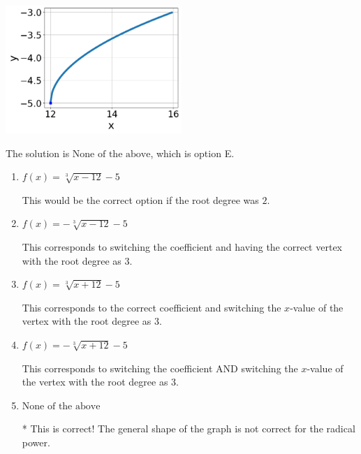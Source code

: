 \documentclass{extbook}[14pt]
\begin{document}
\begin{enumerate}
{\begin{center}
    \includegraphics[width=0.5\textwidth]{../Figures/radicalGraphToEquationA.png}
\end{center}


The solution is \( \text{None of the above} \), which is option E.\begin{enumerate}[label=\Alph*.]
\item \( f(x) = \sqrt[3]{x - 12} - 5 \)

This would be the correct option if the root degree was $2$.
\item \( f(x) = - \sqrt[3]{x - 12} - 5 \)

This corresponds to switching the coefficient and having the correct vertex with the root degree as $3$.
\item \( f(x) = \sqrt[3]{x + 12} - 5 \)

This corresponds to the correct coefficient and switching the $x$-value of the vertex with the root degree as $3$.
\item \( f(x) = - \sqrt[3]{x + 12} - 5 \)

This corresponds to switching the coefficient AND switching the $x$-value of the vertex with the root degree as $3$.
\item \( \text{None of the above} \)

* This is correct! The general shape of the graph is not correct for the radical power.
\end{enumerate}

}
\end{enumerate}
\end{document}
